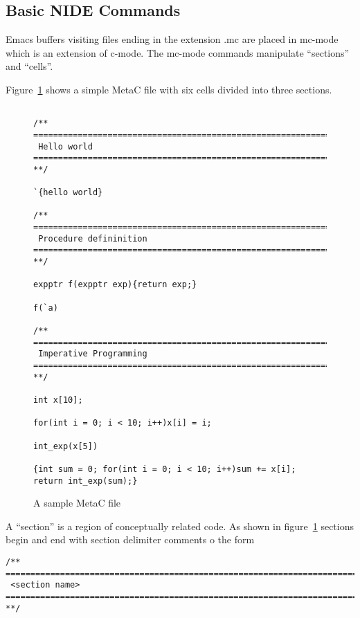 \documentclass{article}
\begin{document}
\subsection{Basic NIDE Commands}

Emacs buffers visiting files ending in the extension .mc are placed
in mc-mode which is an extension of c-mode.  The mc-mode commands
manipulate ``sections'' and ``cells''.

Figure~\ref{fig:sample-file} shows a simple MetaC file with six cells divided into three sections.

\begin{figure}

{\small
\begin{verbatim}

/** ========================================================================
 Hello world
======================================================================== **/

`{hello world}

/** ========================================================================
 Procedure defininition
======================================================================== **/

expptr f(expptr exp){return exp;}

f(`a)

/** ========================================================================
 Imperative Programming
======================================================================== **/

int x[10];

for(int i = 0; i < 10; i++)x[i] = i;

int_exp(x[5])

{int sum = 0; for(int i = 0; i < 10; i++)sum += x[i]; return int_exp(sum);}
\end{verbatim}
}
\caption{A sample MetaC file}
\label{fig:sample-file}
\end{figure}
  
\noindent A ``section'' is a region of conceptually related code.  As shown in figure~\ref{fig:sample-file}
sections begin and end with
section delimiter comments o the form

\begin{verbatim}
/** ========================================================================
 <section name>
======================================================================== **/
\end{verbatim}
\end{document}
